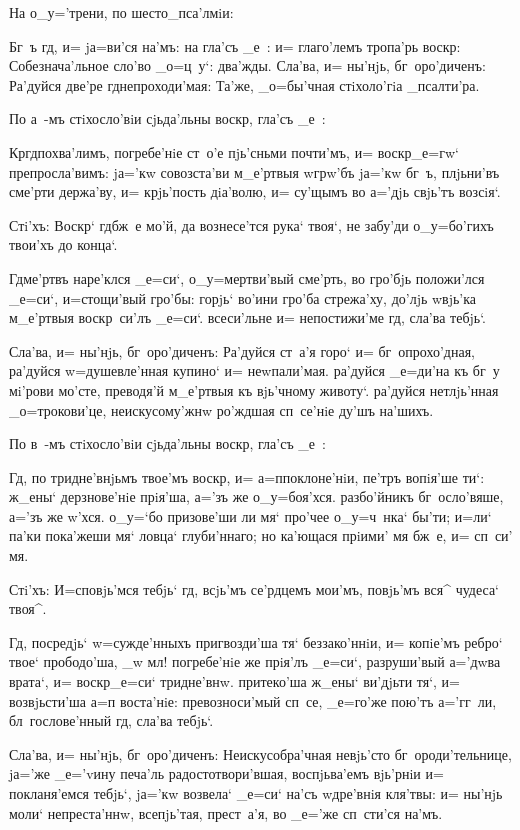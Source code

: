 На о_у='трени, по шесто_пса'лмiи:

Бг~ъ гд, и= jа=ви'ся на'мъ: на гла'съ _е~: и= 
глаго'лемъ тропа'рь воскр: Собезнача'льное сло'во 
_о=ц~у`: два'жды. Сла'ва, и= ны'нjь, бг~оро'диченъ: 
Ра'дуйся две'ре гд непроходи'мая: Та'же, _о=бы'чная 
стiхоло'гiа _псалти'ра.

По а~-мъ стiхосло'вiи сjьда'льны воскр, гла'съ 
_е~: 

Кр гд похва'лимъ, погребе'нiе ст~о'е 
пjь'сньми почти'мъ, и= воскр _е=гw` препросла'вимъ: 
jа='кw совозста'ви м_е'ртвыя w\т грw'бъ jа='кw бг~ъ, 
плjьни'въ сме'рти держа'ву, и= крjь'пость дiа'волю, и= 
су'щымъ во а='дjь свjь'тъ возсiя`.

Стi'хъ: Воскр` гд бж~е мо'й, да вознесе'тся 
рука` твоя`, не забу'ди о_у=бо'гихъ твои'хъ до конца`.

Гд ме'ртвъ наре'клся _е=си`, о_у=мертви'вый 
сме'рть, во гро'бjь положи'лся _е=си`, и=стощи'вый 
гро'бы: горjь` во'ини гро'ба стрежа'ху, до'лjь w\т вjь'ка 
м_е'ртвыя воскр~си'лъ _е=си`. всеси'льне и= непостижи'ме 
гд, сла'ва тебjь`.

Сла'ва, и= ны'нjь, бг~оро'диченъ: Ра'дуйся ст~а'я 
горо` и= бг~опрохо'дная, ра'дуйся w=душевле'нная купино` 
и= неwпали'мая. ра'дуйся _е=ди'на къ бг~у мi'рови мо'сте, 
преводя'й м_е'ртвыя къ вjь'чному животу`. ра'дуйся 
нетлjь'нная _о=трокови'це, неискусому'жнw ро'ждшая 
сп~се'нiе ду'шъ на'шихъ.

По в~-мъ стiхосло'вiи сjьда'льны воскр, гла'съ 
_е~: 

Гд, по тридне'внjьмъ твое'мъ воскр, и= 
а=п поклоне'нiи, пе'тръ вопiя'ше ти`: ж_ены` 
дерзнове'нiе прiя'ша, а='зъ же о_у=боя'хся. разбо'йникъ 
бг~осло'вяше, а='зъ же w'хся. о_у=`бо призове'ши 
ли мя` про'чее о_у=ч~нка` бы'ти; и=ли` па'ки пока'жеши 
мя` ловца` глуби'ннаго; но ка'ющася прiими' мя бж~е, и= 
сп~си' мя. 

Стi'хъ: И=сповjь'мся тебjь` гд, всjь'мъ се'рдцемъ 
мои'мъ, повjь'мъ вся^ чудеса` твоя^.

Гд, посредjь` w=сужде'нныхъ пригвозди'ша тя` 
беззако'ннiи, и= копiе'мъ ребро` твое` прободо'ша, _w 
мл! погребе'нiе же прiя'лъ _е=си`, разруши'вый 
а='дwва врата`, и= воскр _е=си` тридне'внw. 
притеко'ша ж_ены` ви'дjьти тя`, и= возвjьсти'ша а=п 
воста'нiе: превозноси'мый сп~се, _е=го'же пою'тъ 
а='гг~ли, бл~гослове'нный гд, сла'ва тебjь`.

Сла'ва, и= ны'нjь, бг~оро'диченъ: Неискусобра'чная 
невjь'сто бг~ороди'тельнице, jа='же _е='vину печа'ль 
радостотвори'вшая, воспjьва'емъ вjь'рнiи и= покланя'емся 
тебjь`, jа='кw возвела` _е=си` на'съ w\т дре'внiя 
кля'твы: и= ны'нjь моли` непреста'ннw, всепjь'тая, 
прест~а'я, во _е='же сп~сти'ся на'мъ.

